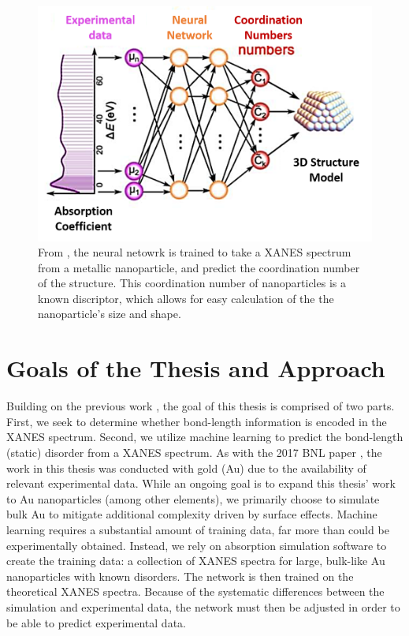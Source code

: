\begin{figure}
    \centering
    \includegraphics[width=.75\linewidth]{Chapters/Figures/placeholderFrenkel2017.png}
    \caption[ANN Metallic Nanoparticles]{From \cite{Timoshenko2017}, the neural netowrk is trained to take a XANES spectrum from a metallic nanoparticle, and predict the coordination number of the structure. This coordination number of nanoparticles is a known discriptor, which allows for easy calculation of the the nanoparticle's size and shape.}
\end{figure}

\section{Goals of the Thesis and Approach}
Building on the previous work \cite{Timoshenko2017}, the goal of this thesis is comprised of two parts. First, we seek to determine whether bond-length information is encoded in the XANES spectrum. Second, we utilize machine learning to predict the bond-length (static) disorder from a XANES spectrum. As with the 2017 BNL paper \cite{Timoshenko2017}, the work in this thesis was conducted with gold (Au) due to the availability of relevant experimental data. While an ongoing goal is to expand this thesis' work to Au nanoparticles (among other elements), we primarily choose to simulate bulk Au to mitigate additional complexity driven by surface effects. Machine learning requires a substantial amount of training data, far more than could be experimentally obtained. Instead, we rely on absorption simulation software to create the training data: a collection of XANES spectra for large, bulk-like Au nanoparticles with known disorders. The network is then trained on the theoretical XANES spectra. Because of the systematic differences between the simulation and experimental data, the network must then be adjusted in order to be able to predict experimental data.

